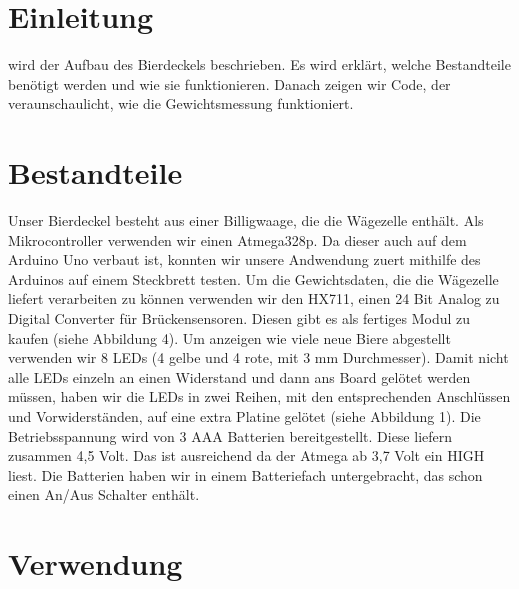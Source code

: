 \documentclass[12pt,journal,compsoc]{IEEEtran}
\begin{document}
\section{Einleitung}

% 
% 
% 
% 
 wird der Aufbau des Bierdeckels beschrieben.
Es wird erklärt, welche Bestandteile benötigt werden und wie sie funktionieren.
Danach zeigen wir Code, der veraunschaulicht, wie die Gewichtsmessung funktioniert.


\section{Bestandteile}


Unser Bierdeckel besteht aus einer Billigwaage, die die Wägezelle enthält.
Als Mikrocontroller verwenden wir einen Atmega328p. Da dieser auch auf dem Arduino Uno verbaut
ist, konnten wir unsere Andwendung zuert mithilfe des Arduinos auf einem Steckbrett testen.
Um die Gewichtsdaten, die die Wägezelle liefert verarbeiten zu können verwenden wir den HX711,
einen 24 Bit Analog zu Digital Converter für Brückensensoren. Diesen gibt es als fertiges Modul
zu kaufen (siehe Abbildung 4). Um anzeigen wie viele neue Biere abgestellt verwenden wir 8 LEDs
(4 gelbe und 4 rote, mit 3 mm Durchmesser). Damit nicht alle LEDs einzeln an einen Widerstand
und dann ans Board gelötet werden müssen, haben wir die LEDs in zwei Reihen, mit den
entsprechenden Anschlüssen und Vorwiderständen, auf eine extra Platine gelötet (siehe Abbildung 1).
Die Betriebsspannung wird von 3 AAA Batterien bereitgestellt. Diese liefern zusammen 4,5 Volt.
Das ist ausreichend da der Atmega ab 3,7 Volt ein HIGH liest. Die Batterien haben wir in einem
Batteriefach untergebracht, das schon einen An/Aus Schalter enthält.

\section{Verwendung}
\end{document}
